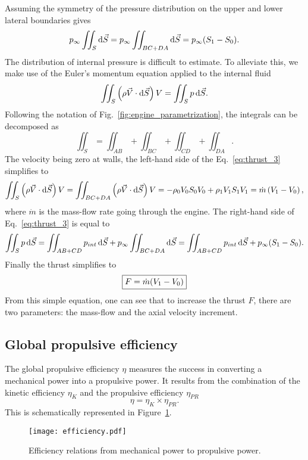 Assuming the symmetry of the pressure distribution
on the upper and lower lateral boundaries gives
\begin{equation}
	p_{\infty} \iint_{S} \diff \vec{S} = 
	p_{\infty} \iint_{BC + DA} \diff \vec{S} =
	p_{\infty} (S_{1} - S_{0}).
	\label{eq:thrust_2}
\end{equation}
The distribution of internal pressure is
difficult to estimate. To alleviate this, 
we make use of the Euler’s momentum 
equation applied to the internal fluid
\begin{equation}
	\iint_{S} \left(\rho \vec{V} \cdot \diff \vec{S} \right) V = 
	\iint_{S} p \diff \vec{S}.
	\label{eq:thrust_3}
\end{equation}
Following the notation of Fig.~\ref{fig:engine_parametrization},
the integrals can be decomposed as
\begin{equation}
	\iint_{S} = \iint_{AB} + \iint_{BC} + \iint_{CD} + \iint_{DA}.
\end{equation}
The velocity being zero at walls, 
the left-hand side of the Eq.~\eqref{eq:thrust_3}
simplifies to
\begin{equation}
	\iint_{S} \left(\rho \vec{V} \cdot \mathop{}\!\mathrm{d} \vec{S} \right) V =
	\iint_{BC + DA} \left(\rho \vec{V} \cdot \mathop{}\!\mathrm{d} \vec{S} \right) V =
	- \rho_0 V_0 S_0 V_0 +  \rho_1 V_1 S_1 V_1 = 
	\dot{m} \left( V_{1} - V_{0} \right),
\end{equation}
where $\dot{m}$ is the mass-flow rate going through the engine.
The right-hand side of Eq.~\eqref{eq:thrust_3}
is equal to 
\begin{equation}
	\iint_{S} p \mathop{}\!\mathrm{d} \vec{S} = 
	\iint_{AB + CD} p_{int} \mathop{}\!\mathrm{d} \vec{S} +
	p_{\infty} \iint_{BC + DA} \mathop{}\!\mathrm{d} \vec{S} =
	\iint_{AB + CD} p_{int} \mathop{}\!\mathrm{d} \vec{S} +
	p_{\infty} (S_{1} - S_{0}).
\end{equation}
Finally the thrust simplifies to
\begin{equation}
	\fbox{$
	F = \dot{m} (V_{1} - V_{0})
	$}
	\label{eq:cror_thrust}
\end{equation}
From this simple equation,
one can see that to increase the thrust $F$, there are two parameters:
the mass-flow and the axial velocity increment.

\subsection{Global propulsive efficiency}
\label{sub:cror_efficiency}

The global propulsive efficiency $\eta$ measures the 
success in converting a mechanical power into a
propulsive power. It results from the combination
of the kinetic efficiency $\eta_{K}$ and the propulsive efficiency
$\eta_{PR}$
\begin{equation}
	\eta = \eta_{K} \times \eta_{PR}.
\end{equation}
This is schematically represented in Figure~\ref{fig:cror_efficiency}.
\begin{figure}[htp]
  \centering
  \texttt{[image: efficiency.pdf]}
  \caption{Efficiency relations from mechanical power to propulsive power.}
  \label{fig:cror_efficiency}
\end{figure}

